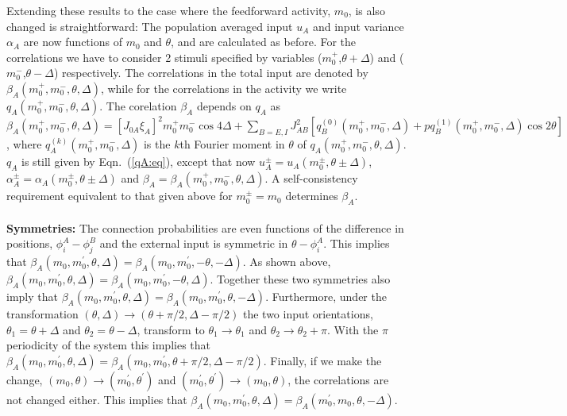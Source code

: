 Extending these results to the case where the feedforward activity, $m_0$, is also 
changed is straightforward:
The population averaged input $u_A$ and input variance $\alpha_A$ are now
functions of $m_0$ and $\theta$, and are calculated as before. 
For the correlations we have to consider 2 stimuli specified by variables
($m_0^+$,$\theta+\Delta$) and ($m_0^-$,$\theta-\Delta$) respectively.  
The correlations in the total input are denoted by 
$\beta_A(m_0^+,m_0^-,\theta,\Delta)$, while for the correlations in the 
activity we write $q_A(m_0^+,m_0^-,\theta,\Delta)$\@.
The corelation $\beta_A$ depends on $q_A$ as
$\beta_A(m_0^+,m_0^-,\theta,\Delta)=[J_{0A}\xi_A]^2m_0^+m_0^-\cos 4\Delta+
\sum_{B=E,I}J_{AB}^2[q_B^{(0)}(m_0^+,m_0^-,\Delta)+
pq_B^{(1)}(m_0^+,m_0^-,\Delta)\cos 2\theta]$, where 
$q_A^{(k)}(m_0^+,m_0^-,\Delta)$ is the $k$th Fourier moment in $\theta$
of $q_A(m_0^+,m_0^-,\theta,\Delta)$\@. $q_A$ is still given by
Eqn.~(\ref{qA:eq}), except that now $u_A^\pm=u_A(m_0^\pm,\theta\pm\Delta)$,
$\alpha_A^\pm=\alpha_A(m_0^\pm,\theta\pm\Delta)$ and 
$\beta_A=\beta_A(m_0^+,m_0^-,\theta,\Delta)$\@.
A self-consistency requirement equivalent to that given above for 
$m_0^\pm=m_0$  determines $\beta_A$.\\
 \\
{\noindent \bf Symmetries:}
The connection probabilities are even functions of the difference in 
positions, $\phi_i^A-\phi_j^B$ and the external input is 
symmetric in $\theta-\phi_i^A$\@. This implies that 
$\beta_{A}(m_0,m_0^\prime,\theta,\Delta)=
\beta_{A}(m_0,m_0^\prime,-\theta,-\Delta)$.
As shown above, $\beta_{A}(m_0,m_0^\prime,\theta,\Delta)=
\beta_{A}(m_0,m_0^\prime,-\theta,\Delta)$\@. Together these two symmetries also imply that
$\beta_{A}(m_0,m_0^\prime,\theta,\Delta)=
\beta_{A}(m_0,m_0^\prime,\theta,-\Delta)$\@. Furthermore, under the 
transformation $(\theta,\Delta)\rightarrow (\theta+\pi/2,\Delta-\pi/2)$ the two
input orientations, $\theta_1=\theta+\Delta$ and $\theta_2=\theta-\Delta$, 
transform to $\theta_1 \rightarrow \theta_1$ and 
$\theta_2\rightarrow\theta_2+\pi$\@. With the $\pi$ periodicity of the system 
this implies that $\beta_{A}(m_0,m_0^\prime,\theta,\Delta)=
\beta_{A}(m_0,m_0^\prime,\theta+\pi/2,\Delta-\pi/2)$\@. Finally, if we make the
change, $(m_0,\theta)\rightarrow(m_0^\prime,\theta^\prime)$ and 
$(m_0^\prime,\theta^\prime)\rightarrow(m_0,\theta)$, the correlations are not 
changed either. This implies that 
$\beta_{A}(m_0,m_0^\prime,\theta,\Delta)=\beta_{A}(m_0^\prime,m_0,\theta,-\Delta)$\@.


